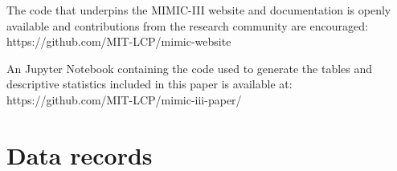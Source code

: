 \documentclass[english]{article}
\begin{document}

The code that underpins the MIMIC-III website and documentation is openly available and contributions from the research community are encouraged: \\ https://github.com/MIT-LCP/mimic-website

An Jupyter Notebook containing the code used to generate the tables and descriptive statistics included in this paper is available at: \\ https://github.com/MIT-LCP/mimic-iii-paper/


\section*{Data records}



\end{document}
